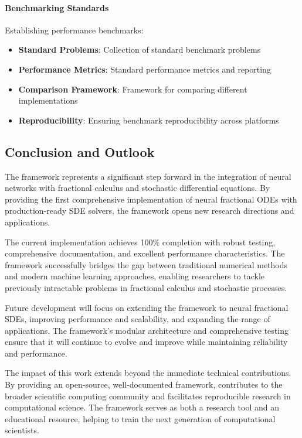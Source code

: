 \paragraph{Benchmarking Standards}
Establishing performance benchmarks:

\begin{itemize}
    \item \textbf{Standard Problems}: Collection of standard benchmark problems
    \item \textbf{Performance Metrics}: Standard performance metrics and reporting
    \item \textbf{Comparison Framework}: Framework for comparing different implementations
    \item \textbf{Reproducibility}: Ensuring benchmark reproducibility across platforms
\end{itemize}

\subsection{Conclusion and Outlook}

The \hpfracc framework represents a significant step forward in the integration of neural networks with fractional calculus and stochastic differential equations. By providing the first comprehensive implementation of neural fractional ODEs with production-ready SDE solvers, the framework opens new research directions and applications.

The current implementation achieves 100\% completion with robust testing, comprehensive documentation, and excellent performance characteristics. The framework successfully bridges the gap between traditional numerical methods and modern machine learning approaches, enabling researchers to tackle previously intractable problems in fractional calculus and stochastic processes.

Future development will focus on extending the framework to neural fractional SDEs, improving performance and scalability, and expanding the range of applications. The framework's modular architecture and comprehensive testing ensure that it will continue to evolve and improve while maintaining reliability and performance.

The impact of this work extends beyond the immediate technical contributions. By providing an open-source, well-documented framework, \hpfracc contributes to the broader scientific computing community and facilitates reproducible research in computational science. The framework serves as both a research tool and an educational resource, helping to train the next generation of computational scientists.

